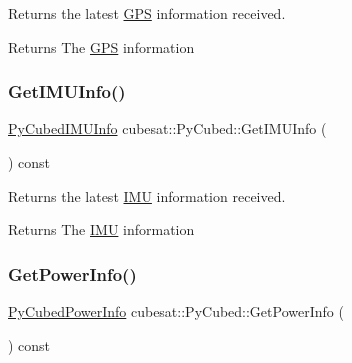 Returns the latest \hyperlink{classcubesat_1_1GPS}{G\+PS} information received. 

\begin{DoxyReturn}{Returns}
The \hyperlink{classcubesat_1_1GPS}{G\+PS} information 
\end{DoxyReturn}
\mbox{\label{classcubesat_1_1PyCubed_a74fd4657765351e136367592db3e3445}} 
\subsubsection{\texorpdfstring{Get\+I\+M\+U\+Info()}{GetIMUInfo()}}
{\footnotesize\ttfamily \hyperlink{structcubesat_1_1PyCubedIMUInfo}{Py\+Cubed\+I\+M\+U\+Info} cubesat\+::\+Py\+Cubed\+::\+Get\+I\+M\+U\+Info (\begin{DoxyParamCaption}{ }\end{DoxyParamCaption}) const\hspace{0.3cm}{\ttfamily [inline]}}



Returns the latest \hyperlink{classcubesat_1_1IMU}{I\+MU} information received. 

\begin{DoxyReturn}{Returns}
The \hyperlink{classcubesat_1_1IMU}{I\+MU} information 
\end{DoxyReturn}
\mbox{\label{classcubesat_1_1PyCubed_ae934c1fb36fbf3865ee884401dc11aaa}} 
\subsubsection{\texorpdfstring{Get\+Power\+Info()}{GetPowerInfo()}}
{\footnotesize\ttfamily \hyperlink{structcubesat_1_1PyCubedPowerInfo}{Py\+Cubed\+Power\+Info} cubesat\+::\+Py\+Cubed\+::\+Get\+Power\+Info (\begin{DoxyParamCaption}{ }\end{DoxyParamCaption}) const\hspace{0.3cm}{\ttfamily [inline]}}



